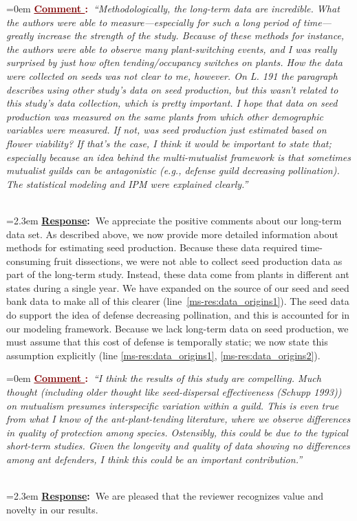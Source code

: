 \documentclass[12pt]{article}
\newcounter{cN}
\newcommand{\comment}[1]{
	\vspace{2em}
	\refstepcounter{cN} %
	\noindent \hangindent=0em \textbf{\textcolor{Maroon}{\uline{Comment \thecN}:~}}\emph{``#1''}
	}
\newcommand{\response}[1]{
	\\[0.25em]
	\hangindent=2.3em \textbf{\textcolor{NavyBlue}{\uline{Response}:~}}#1
	}
\begin{document}
\comment{Methodologically, the long-term data are incredible. 
What the authors were able to measure—especially for such a long period of time—greatly increase the strength of the study. 
Because of these methods for instance, the authors were able to observe many plant-switching events, and I was really surprised by just how often tending/occupancy switches on plants. 
How the data were collected on seeds was not clear to me, however. 
On L. 191 the paragraph describes using other study's data on seed production, but this wasn't related to this study's data collection, which is pretty important. 
I hope that data on seed production was measured on the same plants from which other demographic variables were measured. 
If not, was seed production just estimated based on flower viability?  
If that's the case, I think it would be important to state that; especially because an idea behind the multi-mutualist framework is that sometimes mutualist guilds can be antagonistic (e.g., defense guild decreasing pollination). 
The statistical modeling and IPM were explained clearly.}
\response{We appreciate the positive comments about our long-term data set. 
	As described above, we now provide more detailed information about methods for estimating seed production.
	Because these data required time-consuming fruit dissections, we were not able to collect seed production data as part of the long-term study. 
	Instead, these data come from plants in different ant states during a single year. 
	We have expanded on the source of our seed and seed bank data to make all of this clearer (line~\ref{ms-res:data_origins1}). 
	The seed data do support the idea of defense decreasing pollination, and this is accounted for in our modeling framework. 
	Because we lack long-term data on seed production, we must assume that this cost of defense is temporally static; we now state this assumption explicitly (line \ref{ms-res:data_origins1}, \ref{ms-res:data_origins2}).}

\comment{I think the results of this study are compelling. 
Much thought (including older thought like seed-dispersal effectiveness (Schupp 1993)) on mutualism presumes interspecific variation within a guild. 
This is even true from what I know of the ant-plant-tending literature, where we observe differences in quality of protection among species. 
Ostensibly, this could be due to the typical short-term studies. 
Given the longevity and quality of data showing no differences among ant defenders, I think this could be an important contribution.}
\response{We are pleased that the reviewer recognizes value and novelty in our results.}
\end{document}
